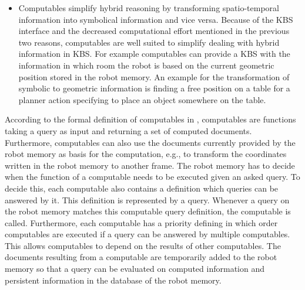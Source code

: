 \begin{itemize}
\item Computables simplify hybrid reasoning by transforming
  spatio-temporal information into symbolical information and vice
  versa. Because of the KBS interface and the decreased computational
  effort mentioned in the previous two reasons, computables are well
  suited to simplify dealing with hybrid information in KBS. For
  example computables can provide a KBS with the information in which
  room the robot is based on the current geometric position
  stored in the robot memory. An example for the transformation of
  symbolic to geometric information is finding a free position on a
  table for a planner action specifying to place an object somewhere on the table.
\end{itemize}

According to the formal definition of computables in
, computables are functions taking a query as
input and returning a set of computed documents. Furthermore,
computables can also use the documents currently provided by the robot
memory as basis for the computation, e.g., to transform the
coordinates written in the robot memory to another frame. The robot
memory has to decide when the function of a computable needs to be
executed given an asked query. To decide this, each computable also
contains a definition which queries can be answered by
it. This definition is represented by a query. Whenever a query on the
robot memory matches this computable query definition, the computable
is called. Furthermore, each computable has a priority defining in which
order computables are executed if a query can be answered by multiple
computables. This allows computables to depend on the results of
other computables. The documents resulting from a computable are
temporarily added to the robot memory so that a query can be evaluated
on computed information and persistent information in the database of
the robot memory.

